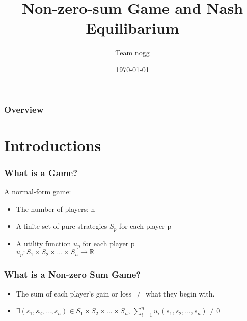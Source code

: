 \documentclass{beamer}
\title[Short title]{Non-zero-sum Game and Nash Equilibarium}
\author{Team nogg}
\institute[SJTU]
{

}
\date{\today}
\begin{document}
\begin{frame}
\titlepage
\end{frame}

\begin{frame}
\frametitle{Overview}
\tableofcontents
\end{frame}

\section{Introductions}
\begin{frame}
\frametitle{What is a Game?}
A normal-form game:\\
\begin{itemize}
\item The {\color{red} number} of players: n
\item A finite {\color{red} set of pure strategies} $S_p$ for each player p
\item A {\color{red} utility function} $u_p$ for each player p\\
        \qquad $u_p : S_1 \times S_2 \times ... \times S_n  \rightarrow \mathbb{R}$\\
\end{itemize}
\end{frame}


\begin{frame}
\frametitle{What is a Non-zero Sum Game?}
\begin{itemize}
\item
The sum of each player's gain or loss $\neq$ what they begin with.
\item
$\exists (s_1,s_2,...,s_n)\in S_1\times S_2 \times ... \times S_n$, $\sum_{i=1}^{n} u_i(s_1,s_2,...,s_n) \neq 0$
\end{itemize}
\end{frame}
\end{document}
